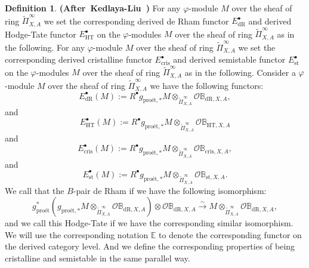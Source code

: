 \documentclass[12pt]{amsart}
\theoremstyle{definition}
\newtheorem{definition}[theorem]{Definition}
\numberwithin{equation}{section}
\begin{document}
\begin{definition} \mbox{\bf{(After Kedlaya-Liu \cite[Definition 8.6.5]{KL16})}} 
For any $\varphi$-module $M$ over the sheaf of ring $\widetilde{\Pi}^\infty_{X,A}$ we set the corresponding derived de Rham functor $E^\bullet_{\mathrm{dR}}$ and derived Hodge-Tate functor $E^\bullet_{\mathrm{HT}}$ on the $\varphi$-modules $M$ over the sheaf of ring $\widetilde{\Pi}^\infty_{X,A}$ as in the following.  For any $\varphi$-module $M$ over the sheaf of ring $\widetilde{\Pi}^\infty_{X,A}$ we set the corresponding derived cristalline functor $E^\bullet_{\mathrm{cris}}$ and derived semistable functor $E^\bullet_{\mathrm{st}}$ on the $\varphi$-modules $M$ over the sheaf of ring $\widetilde{\Pi}^\infty_{X,A}$ as in the following. Consider a $\varphi$-module $M$ over the sheaf of ring $\widetilde{\Pi}^\infty_{X,A}$ we have the following functors:
\begin{displaymath}
E_{\mathrm{dR}}^\bullet(M):=R^\bullet g_{\text{pro\'et},*} M\otimes_{\widetilde{\Pi}^\infty_{X,A}}	 \mathcal{O}\mathbb{B}_{\mathrm{dR},X,A},
\end{displaymath}
and
\begin{displaymath}
E_{\mathrm{HT}}^\bullet(M):=R^\bullet g_{\text{pro\'et},*} M \otimes_{\widetilde{\Pi}^\infty_{X,A}}	 \mathcal{O}\mathbb{B}_{\mathrm{HT},X,A}
\end{displaymath}
and
\begin{displaymath}
E_{\mathrm{cris}}^\bullet(M):=R^\bullet g_{\text{pro\'et},*} M\otimes_{\widetilde{\Pi}^\infty_{X,A}}	 \mathcal{O}\mathbb{B}_{\mathrm{cris},X,A},
\end{displaymath}
and
\begin{displaymath}
E_{\mathrm{st}}^\bullet(M):=R^\bullet g_{\text{pro\'et},*} M \otimes_{\widetilde{\Pi}^\infty_{X,A}}	 \mathcal{O}\mathbb{B}_{\mathrm{st},X,A}.
\end{displaymath}
We call that the $B$-pair de Rham if we have the following isomorphism:
\begin{displaymath}
g^*_\text{pro\'et}(g_{\text{pro\'et},*} M\otimes_{\widetilde{\Pi}^\infty_{X,A}}	 \mathcal{O}\mathbb{B}_{\mathrm{dR},X,A})\otimes\mathcal{O}\mathbb{B}_{\mathrm{dR},X,A} \overset{\sim}{\rightarrow} M \otimes_{\widetilde{\Pi}^\infty_{X,A}}	 \mathcal{O}\mathbb{B}_{\mathrm{dR},X,A},
\end{displaymath}
and we call this Hodge-Tate if we have the corresponding similar isomorphism. We will use the corresponding notation $\mathbb{E}$ to denote the corresponding functor on the derived category level. And we define the corresponding properties of being cristalline and semistable in the same parallel way.
	
\end{definition}
\end{document}
